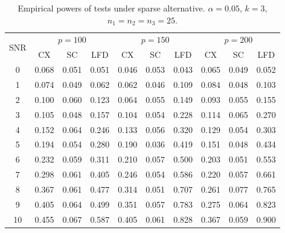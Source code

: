 \documentclass[12pt]{article} %
\theoremstyle{definition}
\begin{document}
\begin{table}[!hbp]
    \caption{Empirical powers of tests under sparse alternative. $\alpha=0.05$, $k=3$, $n_1=n_2=n_3=25$. }
    \label{table4}
    \centering
\begin{tabular}{*{10}{c}}
\toprule
\multirow{2}{*}{SNR} &\multicolumn{3}{c}{$p=100$}&\multicolumn{3}{c}{$p=150$}&\multicolumn{3}{c}{$p=200$} \\
    \cmidrule(r){2-4}\cmidrule(r){5-7}\cmidrule(r){8-10}
        & CX & SC & LFD & CX &SC &LFD &CX & SC & LFD\\
\midrule
0 & 0.068 & 0.051 & 0.051 & 0.046 & 0.053 & 0.043 & 0.065 & 0.049 & 0.052 \\ 
1 & 0.074 & 0.049 & 0.062 & 0.062 & 0.046 & 0.109 & 0.084 & 0.048 & 0.103 \\ 
2 & 0.100 & 0.060 & 0.123 & 0.064 & 0.055 & 0.149 & 0.093 & 0.055 & 0.155 \\ 
3 & 0.105 & 0.048 & 0.157 & 0.104 & 0.054 & 0.228 & 0.114 & 0.065 & 0.270 \\ 
4 & 0.152 & 0.064 & 0.246 & 0.133 & 0.056 & 0.320 & 0.129 & 0.054 & 0.303 \\ 
5 & 0.194 & 0.054 & 0.280 & 0.190 & 0.036 & 0.419 & 0.151 & 0.048 & 0.434 \\ 
6 & 0.232 & 0.059 & 0.311 & 0.210 & 0.057 & 0.500 & 0.203 & 0.051 & 0.553 \\ 
7 & 0.298 & 0.061 & 0.405 & 0.246 & 0.054 & 0.586 & 0.220 & 0.057 & 0.661 \\ 
8 & 0.367 & 0.061 & 0.477 & 0.314 & 0.051 & 0.707 & 0.261 & 0.077 & 0.765 \\ 
9 & 0.405 & 0.064 & 0.499 & 0.351 & 0.057 & 0.783 & 0.275 & 0.064 & 0.823 \\ 
10 & 0.455 & 0.067 & 0.587 & 0.405 & 0.061 & 0.828 & 0.367 & 0.059 & 0.900 \\ 
\bottomrule
\end{tabular}
\end{table}
\end{document}
